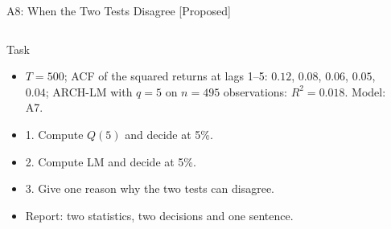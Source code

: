 \begin{frame}{A8: When the Two Tests Disagree [Proposed]}
\propsub
\itemsize{\scriptsize}
\begin{columns}[T]
\begin{column}{\taskw}
\begin{block}{Task}
\begin{itemize}
    \item $T = 500$; ACF of the squared returns at lags 1--5: $0.12$, $0.08$, $0.06$, $0.05$, $0.04$; ARCH-LM with $q = 5$ on $n = 495$ observations: $R^2 = 0.018$. Model: A7.
    \item 1. Compute $Q(5)$ and decide at 5\%.
    \item 2. Compute LM and decide at 5\%.
    \item 3. Give one reason why the two tests can disagree.
    \item Report: two statistics, two decisions and one sentence.
\end{itemize}
\end{block}
\end{column}
\begin{column}{\solw}
\end{column}
\end{columns}
\end{frame}

